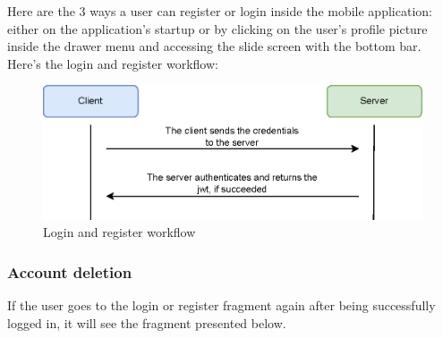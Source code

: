Here are the 3 ways a user can register or login inside the mobile application: either on the application's startup or by clicking on the user's profile picture inside the
drawer menu and accessing the slide screen with the bottom bar.\\

Here's the login and register workflow:

\begin{figure}[H]
    \begin{center}
        \includegraphics[scale=1]{_figures/auth-workflow.eps}
        \caption{Login and register workflow}
    \end{center}
\end{figure}

\subsubsection{Account deletion}

If the user goes to the login or register fragment again after being successfully logged in, it will see the fragment presented below.

